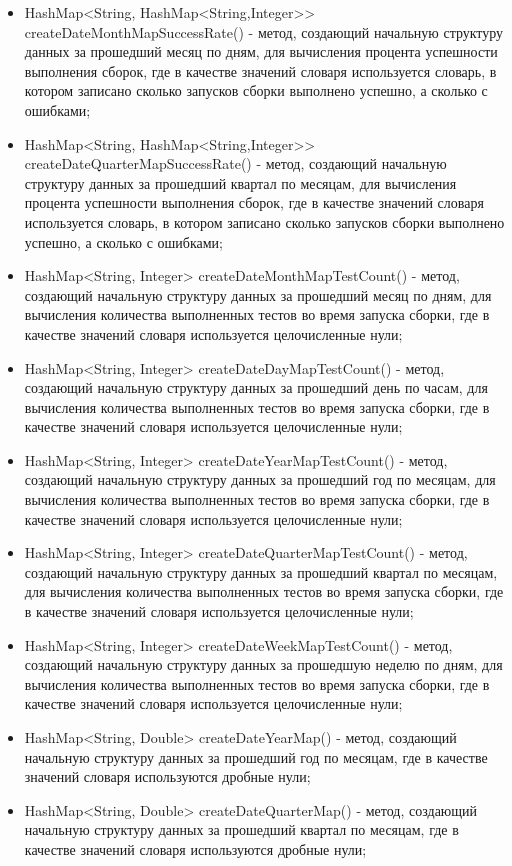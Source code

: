 \begin{itemize}
	\item HashMap<String, HashMap<String,Integer>> createDateMonthMapSuccessRate() - метод, создающий начальную структуру данных за прошедший месяц по дням, для вычисления процента успешности выполнения сборок, где в качестве значений словаря используется словарь, в котором записано сколько запусков сборки выполнено успешно, а сколько с ошибками;
	\item HashMap<String, HashMap<String,Integer>> createDateQuarterMapSuccessRate() - метод, создающий начальную структуру данных за прошедший квартал по месяцам, для вычисления процента успешности выполнения сборок, где в качестве значений словаря используется словарь, в котором записано сколько запусков сборки выполнено успешно, а сколько с ошибками;
	\item HashMap<String, Integer> createDateMonthMapTestCount() - метод, создающий начальную структуру данных за прошедший месяц по дням, для вычисления количества выполненных тестов во время запуска сборки, где в качестве значений словаря используется целочисленные нули;
	\item HashMap<String, Integer> createDateDayMapTestCount() - метод, создающий начальную структуру данных за прошедший день по часам, для вычисления количества выполненных тестов во время запуска сборки, где в качестве значений словаря используется целочисленные нули;
	\item HashMap<String, Integer> createDateYearMapTestCount() - метод, создающий начальную структуру данных за прошедший год по месяцам, для вычисления количества выполненных тестов во время запуска сборки, где в качестве значений словаря используется целочисленные нули;
	\item HashMap<String, Integer> createDateQuarterMapTestCount() - метод, создающий начальную структуру данных за прошедший квартал по месяцам, для вычисления количества выполненных тестов во время запуска сборки, где в качестве значений словаря используется целочисленные нули;
	\item HashMap<String, Integer> createDateWeekMapTestCount() - метод, создающий начальную структуру данных за прошедшую неделю по дням, для вычисления количества выполненных тестов во время запуска сборки, где в качестве значений словаря используется целочисленные нули;
	\item HashMap<String, Double> createDateYearMap() - метод, создающий начальную структуру данных за прошедший год по месяцам, где в качестве значений словаря используются дробные нули;
	\item HashMap<String, Double> createDateQuarterMap() - метод, создающий начальную структуру данных за прошедший квартал по месяцам, где в качестве значений словаря используются дробные нули;

\end{itemize}
